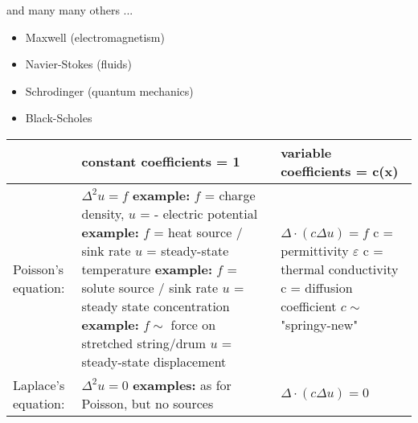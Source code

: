 \documentclass{article}
\theoremstyle{mytheoremstyle}
\theoremstyle{mytheoremstyle}
\theoremstyle{myproblemstyle}
\begin{document}
    \noindent and many many others ...
    \begin{itemize}
	\item Maxwell (electromagnetism)
	\item Navier-Stokes (fluids)
	\item Schrodinger (quantum mechanics)
	\item Black-Scholes
    \end{itemize}

    \begin{center}
	\begin{tabular}{ | m{5cm} | m{5cm} | m{5cm} | }
		\hline
		 & constant coefficients = 1 &
		 variable coefficients = c(\textbf{x}) \\

		 \hline
		 Poisson's equation: 
		 &
		 $ \Delta^2 u = f $ \newline \newline
		 \textbf{example:} $ f $ = charge density, 
		 \newline
		 $ u $ = - electric potential 
		 \newline
		 \textbf{example:} $ f $ = heat source / sink rate 
		 \newline
		 $ u $ = steady-state temperature 
		 \newline
		 \textbf{example:} $ f $ = solute source / sink rate 
		 \newline
		 $ u $ = steady state concentration 
		 \newline
		 \textbf{example:} $ f  \sim $ force on stretched string/drum 
		 \newline
		 $ u $ = steady-state displacement
		 &
		 $ \Delta \cdot (c \Delta u) = f $
		 \newline \newline \newline
		 c = permittivity $ \varepsilon $ \newline \newline \newline
		 c = thermal conductivity \newline \newline \newline
		 c = diffusion coefficient \newline \newline \newline
		 $ c \sim $ "springy-new" \\

		 \hline
		 Laplace's equation:
		 &
		 $ \Delta^2 u = 0 $ \newline
		 \textbf{examples:} as for Poisson, but no sources
		 &
		 $ \Delta \cdot (c \Delta u) = 0 $ \\


\end{tabular}
\end{center}
\end{document}
